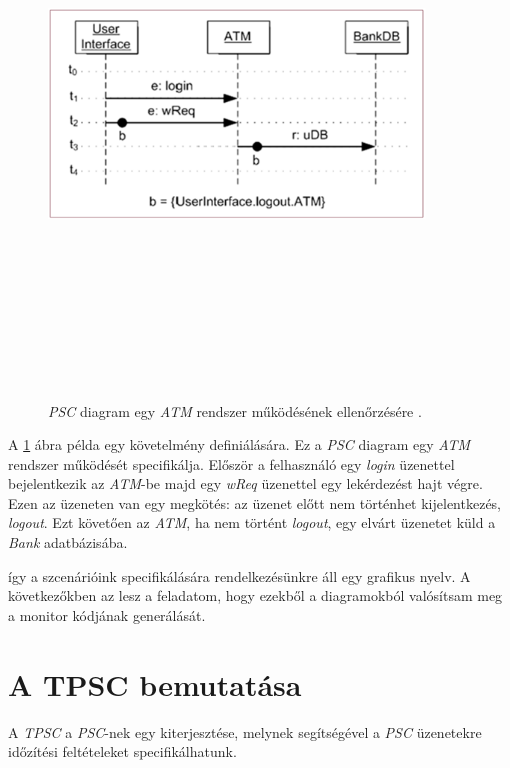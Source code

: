 \begin{figure}[!ht]
    \centering
    \includegraphics[width=100mm, height=15cm, keepaspectratio]{figures/3abra.png}
    \caption{\textit{PSC} diagram egy \textit{ATM} rendszer működésének ellenőrzésére \cite{PSC1}.}
    \label{psc_példa}
\end{figure}
A \ref{psc_példa} ábra példa egy követelmény definiálására.
Ez a \textit{PSC} diagram egy \textit{ATM} rendszer működését specifikálja.
Először a felhasználó egy \textit{login} üzenettel bejelentkezik az \textit{ATM}-be majd egy \textit{wReq} üzenettel egy lekérdezést hajt végre.
Ezen az üzeneten van egy megkötés: az üzenet előtt nem történhet kijelentkezés, \textit{logout}.
Ezt követően az \textit{ATM}, ha nem történt \textit{logout}, egy elvárt üzenetet küld a \textit{Bank} adatbázisába.

így a szcenárióink specifikálására rendelkezésünkre áll egy grafikus nyelv.
A következőkben az lesz a feladatom, hogy ezekből a diagramokból valósítsam meg a monitor kódjának generálását.

\section{A TPSC bemutatása}
A \textit{TPSC} \cite{TPSC1} a \textit{PSC}-nek egy kiterjesztése, melynek segítségével a \textit{PSC} üzenetekre időzítési feltételeket specifikálhatunk.

